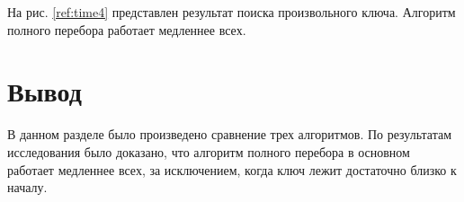 На рис. \ref{ref:time4} представлен результат поиска произвольного ключа.
Алгоритм полного перебора работает медленнее всех.

\begin{figure}[ht!]
\end{figure}

\section{Вывод}

В данном разделе было произведено сравнение трех алгоритмов.
По результатам исследования было доказано, что алгоритм полного перебора
в основном работает медленнее всех, за исключением, когда ключ лежит достаточно
близко к началу.
